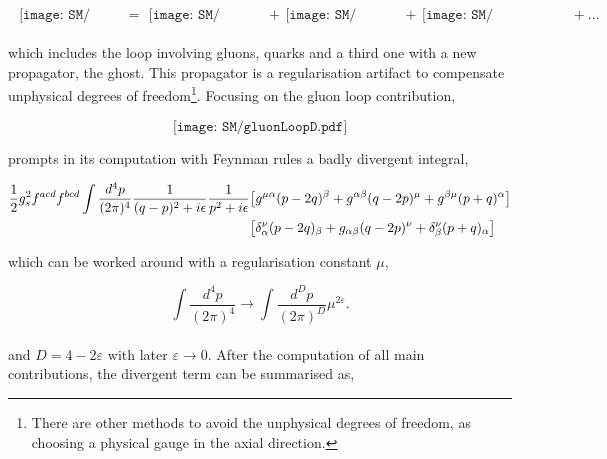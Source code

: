 \begin{align}
    \begin{gathered}
        \texttt{[image: SM/gluonSEC.pdf]}
    \end{gathered}&=\begin{gathered}\texttt{[image: SM/gluonLoopC.pdf]}
    \end{gathered}&+\begin{gathered}\texttt{[image: SM/gluonLoopA.pdf]}
    \end{gathered}&+\begin{gathered}\texttt{[image: SM/gluonLoopB.pdf]}
    \end{gathered}+ ...
    \end{align}


which includes the loop involving gluons, quarks and a third one with a new propagator, the ghost. This propagator is a regularisation artifact to compensate unphysical degrees of freedom\footnote{There are other methods to avoid the unphysical degrees of freedom, as choosing a physical gauge in the axial direction.}. Focusing on the gluon loop contribution,

\begin{equation}
\texttt{[image: SM/gluonLoopD.pdf]}
\end{equation}

prompts in its computation with Feynman rules a badly divergent integral,  

\begin{align}
    \begin{split} 
        \frac{1}{2}g_s^2f^{acd}f^{bcd}\int\frac{d^4p}{(2\pi)^4} \frac{1}{(q-p)^2+i\epsilon}\frac{1}{p^2+i\epsilon}&\qty[g^{\mu\alpha}(p-2q)^\beta+g^{\alpha\beta}(q-2p)^\mu+g^{\beta\mu}(p+q)^\alpha]\\
       &\qty[\delta_\alpha^\nu(p-2q)_\beta+g_{\alpha\beta}(q-2p)^\nu+\delta_\beta^\nu(p+q)_\alpha]
       \label{ipi}
    \end{split}
    \end{align}

which can be worked around with a regularisation constant $\mu$,

\begin{equation*}
    \int \frac{d^4p}{(2\pi)^4}\to \int \frac{d^Dp}{(2\pi)^D}\mu^{2\varepsilon}.
\end{equation*}\\

and $D=4-2\varepsilon$ with later $\varepsilon\to 0$. After the computation of all main contributions, the divergent term can be summarised as,

